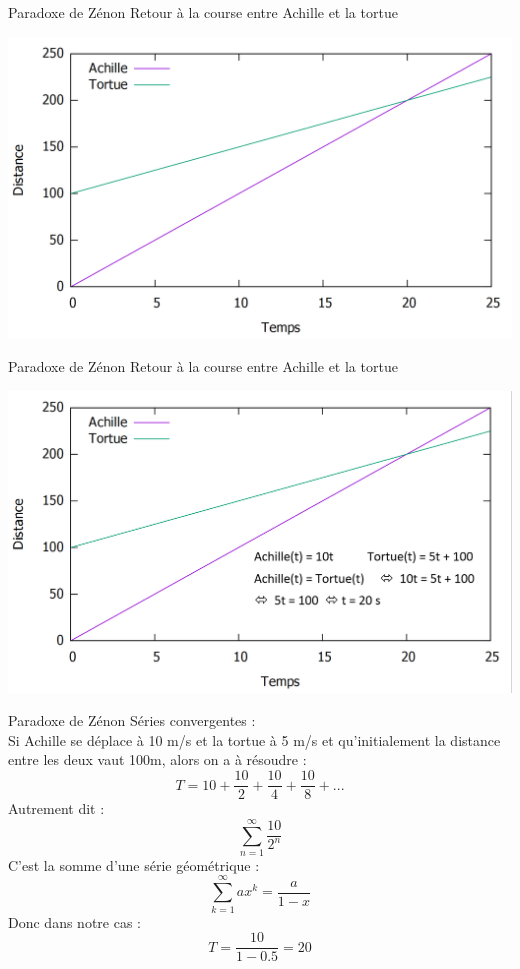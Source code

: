 \documentclass[11pt]{beamer}
\begin{document}
\begin{frame}{Paradoxe de Zénon}
Retour à la course entre Achille et la tortue 
\pause
\begin{center}
	\includegraphics[scale=0.35]{ZAPT2.png}
\end{center}
\end{frame}
\begin{frame}{Paradoxe de Zénon}
Retour à la course entre Achille et la tortue 
\pause
\begin{center}
	\includegraphics[scale=0.35]{ZAPT3.png}
\end{center}
\end{frame}
\begin{frame}{Paradoxe de Zénon}
	Séries convergentes :
	\\ Si Achille se déplace à 10 m/s et la tortue à 5 m/s et qu'initialement la distance entre les deux vaut 100m, alors on a à résoudre : 
	\[ T = 10 + \frac{10}{2} +  \frac{10}{4} + \frac{10}{8} + ...\] \pause
	Autrement dit :
	\[ \sum_{n=1}^{\infty} \frac{10}{2^n}\]
	C'est la somme d'une série géométrique : \[\sum_{k=1}^{\infty} ax^k = \frac{a}{1-x} \] \pause 
	Donc dans notre cas : \[ T = \frac{10}{1- 0.5} = 20 \]
\end{frame}
\end{document}

